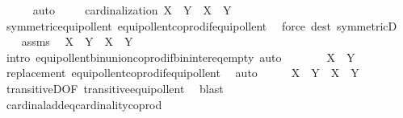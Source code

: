\begin{isabellebody}
\ \ \ \ \isamarkupfalse%
\ auto\ \isanewline
\ \ \isamarkupfalse%
\ cardinalization{\isacharcolon}{\kern0pt}\ {\isachardoublequoteopen}X\ {\isasymCoprod}\ Y\ {\isasymapprox}\ {\isacharbar}{\kern0pt}X{\isacharbar}{\kern0pt}\ {\isasymCoprod}\ {\isacharbar}{\kern0pt}Y{\isacharbar}{\kern0pt}{\isachardoublequoteclose}\isanewline
\ \ \ \ \isamarkupfalse%
\ symmetric{\isacharunderscore}{\kern0pt}equipollent\ equipollent{\isacharunderscore}{\kern0pt}coprod{\isacharunderscore}{\kern0pt}if{\isacharunderscore}{\kern0pt}equipollent\ \isamarkupfalse%
\ {\isacharparenleft}{\kern0pt}force\ dest{\isacharcolon}{\kern0pt}\ symmetricD{\isacharparenright}{\kern0pt}\isanewline
\ \ \isamarkupfalse%
\ assms\ \isamarkupfalse%
\ {\isachardoublequoteopen}X\ {\isasymunion}\ Y\ {\isasymapprox}\ X\ {\isasymCoprod}\ Y{\isachardoublequoteclose}\ \isamarkupfalse%
\ {\isacharparenleft}{\kern0pt}intro\ equipollent{\isacharunderscore}{\kern0pt}bin{\isacharunderscore}{\kern0pt}union{\isacharunderscore}{\kern0pt}coprod{\isacharunderscore}{\kern0pt}if{\isacharunderscore}{\kern0pt}bin{\isacharunderscore}{\kern0pt}inter{\isacharunderscore}{\kern0pt}eq{\isacharunderscore}{\kern0pt}empty{\isacharparenright}{\kern0pt}\ auto\isanewline
\ \ \isamarkupfalse%
\ \isamarkupfalse%
\ {\isachardoublequoteopen}{\isachardot}{\kern0pt}{\isachardot}{\kern0pt}{\isachardot}{\kern0pt}\ {\isasymapprox}\ {\isacharbar}{\kern0pt}X{\isacharbar}{\kern0pt}\ {\isasymCoprod}\ {\isacharbar}{\kern0pt}Y{\isacharbar}{\kern0pt}{\isachardoublequoteclose}\ \isanewline
\ \ \ \ \isamarkupfalse%
\ replacement\ equipollent{\isacharunderscore}{\kern0pt}coprod{\isacharunderscore}{\kern0pt}if{\isacharunderscore}{\kern0pt}equipollent\ \isamarkupfalse%
\ auto\isanewline
\ \ \isamarkupfalse%
\ \isamarkupfalse%
\ {\isachardoublequoteopen}X\ {\isasymunion}\ Y\ {\isasymapprox}\ {\isacharbar}{\kern0pt}X{\isacharbar}{\kern0pt}\ {\isasymCoprod}\ {\isacharbar}{\kern0pt}Y{\isacharbar}{\kern0pt}{\isachardoublequoteclose}\ \isamarkupfalse%
\ transitiveD{\isacharbrackleft}{\kern0pt}OF\ transitive{\isacharunderscore}{\kern0pt}equipollent{\isacharbrackright}{\kern0pt}\ \isamarkupfalse%
\ blast\isanewline
\ \ \isamarkupfalse%
\ cardinal{\isacharunderscore}{\kern0pt}add{\isacharunderscore}{\kern0pt}eq{\isacharunderscore}{\kern0pt}cardinality{\isacharunderscore}{\kern0pt}coprod\ \isamarkupfalse%

\end{isabellebody}
